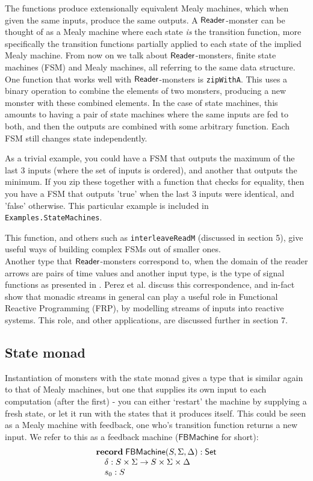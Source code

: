 The functions produce extensionally equivalent Mealy machines, which when given the same inputs, produce the same outputs. A $\mathsf{Reader}$-monster can be thought of as a Mealy machine where each state \emph{is} the transition function, more specifically the transition functions partially applied to each state of the implied Mealy machine. From now on we talk about $\mathsf{Reader}$-monsters, finite state machines (FSM) and Mealy machines, all referring to the same data structure. \\

One function that works well with $\mathsf{Reader}$-monsters is \verb+zipWithA+. This uses a binary operation to combine the elements of two monsters, producing a new monster with these combined elements. In the case of state machines, this amounts to having a pair of state machines where the same inputs are fed to both, and then the outputs are combined with some arbitrary function. Each FSM still changes state independently.

As a trivial example, you could have a FSM that outputs the maximum of the last $3$ inputs (where the set of inputs is ordered), and another that outputs the minimum. If you zip these together with a function that checks for equality, then you have a FSM that outputs 'true' when the last $3$ inputs were identical, and 'false' otherwise. This particular example is included in \verb+Examples.StateMachines+.

This function, and others such as \verb+interleaveReadM+ (discussed in section 5), give useful ways of building complex FSMs out of smaller ones. \\

Another type that $\mathsf{Reader}$-monsters correspond to, when the domain of the reader arrows are pairs of time values and another input type, is the type of signal functions as presented in \cite{frp_refactored}. Perez et al. discuss this correspondence, and in-fact show that monadic streams in general can play a useful role in Functional Reactive Programming (FRP), by modelling streams of inputs into reactive systems. This role, and other applications, are discussed further in section 7.
                             
\subsection{State monad}

Instantiation of monsters with the state monad gives a type that is similar again to that of Mealy machines, but one that supplies its own input to each computation (after the first) - you can either `restart' the machine by supplying a fresh state, or let it run with the states that it produces itself. This could be seen as a Mealy machine with feedback, one who's transition function returns a new input. We refer to this as a feedback machine ($\mathsf{FBMachine}$ for short):
$$
\begin{array}[t]{l}
\mathbf{record}\;
\mathsf{FBMachine}(S,\Sigma,\Delta):\mathsf{Set}\\
\quad \delta : S \times \Sigma \to S \times \Sigma \times \Delta \\
\quad s_0 : S
\end{array}
$$

